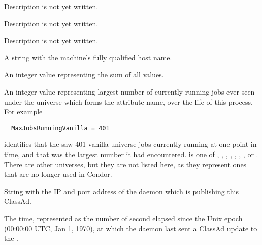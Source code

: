 \begin{description}
\item[\AdAttr{HostsTotal}:] Description is not yet written.

\item[\AdAttr{HostsUnclaimed}:] Description is not yet written.

\item[\AdAttr{IdleJobs}:] Description is not yet written.

\item[\AdAttr{Machine}:] A string with the machine's fully qualified 
  host name.

\item[\AdAttr{MaxJobsRunning<universe}:] An integer value representing 
  the sum of all  values.

\item[\AdAttr{MaxJobsRunning<universe>}:] An integer value representing 
  largest number of currently running jobs ever seen
  under the universe which forms the attribute name, 
  over the life of this  process.
  For example
\begin{verbatim}
  MaxJobsRunningVanilla = 401
\end{verbatim}
  identifies that the  saw 401 vanilla universe jobs
  currently running at one point in time, and that was the largest
  number it had encountered.
   is one of 
  , , , ,
  , , , or .
  There are other universes, but they are not listed here, as they represent
  ones that are no longer used in Condor.

\item[\AdAttr{MyAddress}:] String with the IP and port address of the
 daemon which is publishing this ClassAd.

\item[\AdAttr{MyCurrentTime}:]  The time, represented as the number of 
  second elapsed since the Unix epoch (00:00:00 UTC, Jan 1, 1970),
  at which the  daemon last sent a ClassAd update to the
  .


\end{description}
